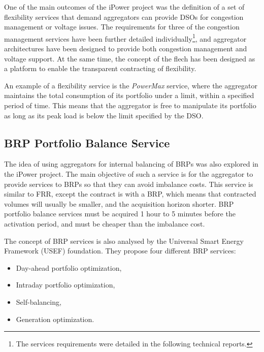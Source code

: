 One of the main outcomes of the iPower project was the definition of a set of flexibility services that demand aggregators can provide DSOs for congestion management or voltage issues. The requirements for three of the congestion management services have been further detailed individually\footnote{The services requirements were detailed in the following technical reports\cite{hansen2013flech,biegel2014flech,bondy2014powermax}.}, and aggregator architectures have been designed to provide both congestion management and voltage support. At the same time, the concept of the \gls{flech} has been designed as a platform to enable the transparent contracting of flexibility.

An example of a flexibility service is the \emph{PowerMax} service, where the aggregator maintains the total consumption of its portfolio under a limit, within a specified period of time. This means that the aggregator is free to manipulate its portfolio as long as its peak load is below the limit specified by the DSO.
\subsection{BRP Portfolio Balance Service} %
\label{sub:BRPPortfolioBalance}
The idea of using aggregators for internal balancing of BRPs was also explored in the iPower project. The main objective of such a service is for the aggregator to provide services to BRPs so that they can avoid imbalance costs. This service is similar to FRR, except the contract is with a BRP, which means that contracted volumes will usually be smaller, and the acquisition horizon shorter. BRP portfolio balance services must be acquired 1 hour to 5 minutes before the activation period, and must be cheaper than the imbalance cost.

The concept of BRP services is also analysed by the Universal Smart Energy Framework (USEF) foundation. They propose four different BRP services:
\begin{itemize}
	\item Day-ahead portfolio optimization,
	\item Intraday portfolio optimization,
	\item Self-balancing,
	\item Generation optimization.
\end{itemize}

